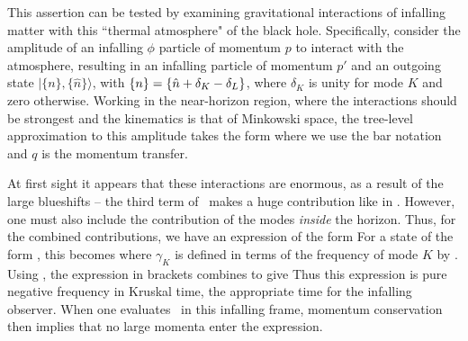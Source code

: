 
This assertion can be tested by examining gravitational interactions of infalling matter with this ``thermal atmosphere" of the black hole. Specifically, consider the amplitude of an infalling $\phi$ particle of momentum $p$ to interact with the atmosphere, resulting in an infalling particle of momentum $p'$ and an outgoing state $|\{n\},\{{\hat n}\}\rangle$, with ${\{n\}}=\{{\hat n} +\delta_K-\delta_L\}$,  where $\delta_K$ is unity for mode $K$ and zero otherwise.    Working in the near-horizon region, where the interactions should be strongest and the kinematics is that of Minkowski space, the tree-level approximation to this amplitude takes the form
%
\eqn{}
%
where we use the bar notation
%
\eqn{}
%
and $q$ is the momentum transfer.

At first sight it appears that these interactions are enormous, as a result of the large blueshifts -- the third term of \fdstexp\ makes a huge contribution like in \fdT.  However, one must also include the contribution of the modes {\it inside} the horizon.  Thus, for the combined contributions, we have an expression of the form
%
\eqn{}
%
For a state of the form \prodH, this becomes
%
\eqn{}
%
where $\gamma_K$ is defined in terms of the frequency of mode $K$ by \gammafd.
Using \vfd, the expression in brackets combines to give
%
\eqn{}
%
Thus this expression is pure negative frequency in Kruskal time, the appropriate time for the infalling observer.  When one evaluates \gravamp\ in this infalling frame, momentum conservation then implies that no large momenta enter the expression.



